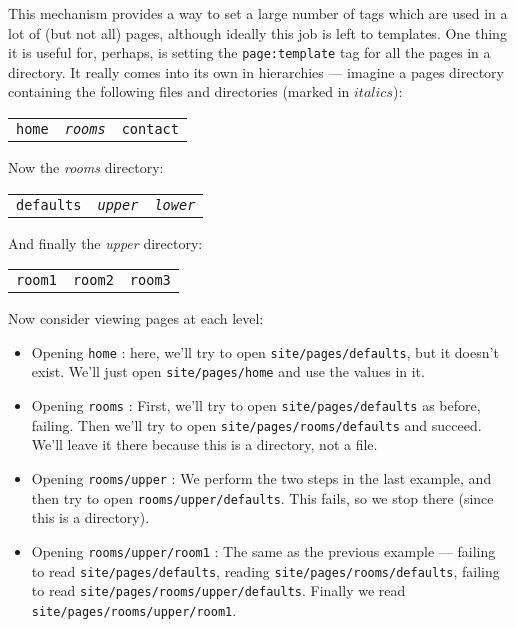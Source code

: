 This mechanism provides a way to set a large number of tags which are used in
a lot of (but not all) pages, although ideally this job is left to templates.
One thing it is useful for, perhaps, is setting the \texttt{page:template} tag
for all the pages in a directory. It really comes into its own in hierarchies
--- imagine a pages directory containing the following files and directories
(marked in $italics$):
\begin{center}
\begin{tabular}{lll}
\texttt{home} & \emph{\texttt{rooms}} & \texttt{contact}
\end{tabular}
\end{center}
Now the \emph{rooms} directory:
\begin{center}
\begin{tabular}{lll}
\texttt{defaults} & \emph{\texttt{upper}} & \emph{\texttt{lower}}
\end{tabular}
\end{center}
And finally the \emph{upper} directory:
\begin{center}
\begin{tabular}{lll}
\texttt{room1} & \texttt{room2} & \texttt{room3}
\end{tabular}
\end{center}
Now consider viewing pages at each level:
\begin{itemize}
 \item Opening \texttt{home} : here, we'll try to open \texttt{site/pages/defaults}, but it doesn't exist. We'll just open \texttt{site/pages/home} and use the values in it.
\item Opening \texttt{rooms} : First, we'll try to open \texttt{site/pages/defaults} as before, failing. Then we'll try to open \texttt{site/pages/rooms/defaults} and succeed. We'll leave it there because this is a directory, not a file.
\item Opening \texttt{rooms/upper} : We perform the two steps in the last example, and then try to open \texttt{rooms/upper/defaults}. This fails, so we stop there (since this is a directory).
\item Opening \texttt{rooms/upper/room1} : The same as the previous example --- failing to read \texttt{site/pages/defaults}, reading \texttt{site/pages/rooms/defaults}, failing to read \texttt{site/pages/rooms/upper/defaults}. Finally we read \texttt{site/pages/rooms/upper/room1}.
\end{itemize}

